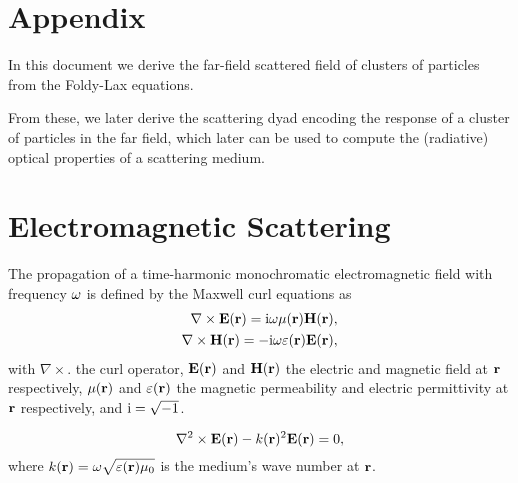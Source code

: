 \section*{\Huge{\textbf{Appendix}}}

In this document we derive the far-field scattered field of clusters of particles from the Foldy-Lax equations. 


From these, we later derive the scattering dyad encoding the response of a cluster of particles in the far field, which later can be used to compute the (radiative) optical properties of a scattering medium. 

\section{Electromagnetic Scattering}
\label{sec:vri}
The propagation of a time-harmonic monochromatic electromagnetic field with frequency $\omega$ is defined by the Maxwell curl equations as
\begin{align}
\nabla\times \mathbf{E}(\mathbf{r}) = \text{i} \omega \mu(\mathbf{r}) \mathbf{H}(\mathbf{r}), \nonumber \\
\nabla\times \mathbf{H}(\mathbf{r}) = -\text{i} \omega \varepsilon(\mathbf{r}) \mathbf{E}(\mathbf{r}),
\label{eq:maxwell}
\end{align}
%
with $\nabla\times .$ the curl operator, $\mathbf{E}(\mathbf{r})$ and $\mathbf{H}(\mathbf{r})$ the electric and magnetic field at $\mathbf{r}$ respectively, $\mu(\mathbf{r})$ and $\varepsilon(\mathbf{r})$ the magnetic permeability and electric permittivity at $\mathbf{r}$ respectively, and $\text{i}=\sqrt{-1}$.

\begin{equation}
\nabla^2\times\mathbf{E}(\mathbf{r}) - k(\mathbf{r})^2\mathbf{E}(\mathbf{r}) = 0,
\label{eq:efieldwave}
\end{equation}
where $k(\mathbf{r})=\omega\sqrt{\varepsilon(\mathbf{r})\mu_0}$ is the medium's wave number at $\mathbf{r}$. 

